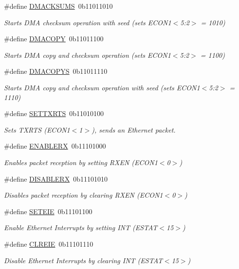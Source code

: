 \begin{DoxyCompactItemize}
\#define \mbox{\hyperlink{group__single__byte_ga4c98f8a75ecaf7988fd864f65ee89c00}{D\+M\+A\+C\+K\+S\+U\+MS}}~0b11011010
\begin{DoxyCompactList}\small\item\em Starts D\+MA checksum operation with seed (sets E\+C\+O\+N1$<$5\+:2$>$ = 1010) \end{DoxyCompactList}\item 
\#define \mbox{\hyperlink{group__single__byte_ga907bfb223f682a2f91b6007155a0adac}{D\+M\+A\+C\+O\+PY}}~0b11011100
\begin{DoxyCompactList}\small\item\em Starts D\+MA copy and checksum operation (sets E\+C\+O\+N1$<$5\+:2$>$ = 1100) \end{DoxyCompactList}\item 
\#define \mbox{\hyperlink{group__single__byte_ga05a3e15f88f8e268907b2ec12420433a}{D\+M\+A\+C\+O\+P\+YS}}~0b11011110
\begin{DoxyCompactList}\small\item\em Starts D\+MA copy and checksum operation with seed (sets E\+C\+O\+N1$<$5\+:2$>$ = 1110) \end{DoxyCompactList}\item 
\#define \mbox{\hyperlink{group__single__byte_ga889d3bef89093b4c5a113384ed539052}{S\+E\+T\+T\+X\+R\+TS}}~0b11010100
\begin{DoxyCompactList}\small\item\em Sets T\+X\+R\+TS (E\+C\+O\+N1$<$1$>$), sends an Ethernet packet. \end{DoxyCompactList}\item 
\#define \mbox{\hyperlink{group__single__byte_ga54713734b9ae7ae4e95e8a9e41a2a2cf}{E\+N\+A\+B\+L\+E\+RX}}~0b11101000
\begin{DoxyCompactList}\small\item\em Enables packet reception by setting R\+X\+EN (E\+C\+O\+N1$<$0$>$) \end{DoxyCompactList}\item 
\#define \mbox{\hyperlink{group__single__byte_ga71b0c6c4ecdcb0051588c13101e9b282}{D\+I\+S\+A\+B\+L\+E\+RX}}~0b11101010
\begin{DoxyCompactList}\small\item\em Disables packet reception by clearing R\+X\+EN (E\+C\+O\+N1$<$0$>$) \end{DoxyCompactList}\item 
\#define \mbox{\hyperlink{group__single__byte_ga18fb24806c923f20700c651f0db72a57}{S\+E\+T\+E\+IE}}~0b11101100
\begin{DoxyCompactList}\small\item\em Enable Ethernet Interrupts by setting I\+NT (E\+S\+T\+A\+T$<$15$>$) \end{DoxyCompactList}\item 
\#define \mbox{\hyperlink{group__single__byte_gaefaf2ed14e418c07c6587043c0ecd0f9}{C\+L\+R\+E\+IE}}~0b11101110
\begin{DoxyCompactList}\small\item\em Disable Ethernet Interrupts by clearing I\+NT (E\+S\+T\+A\+T$<$15$>$) \end{DoxyCompactList}\end{DoxyCompactItemize}


